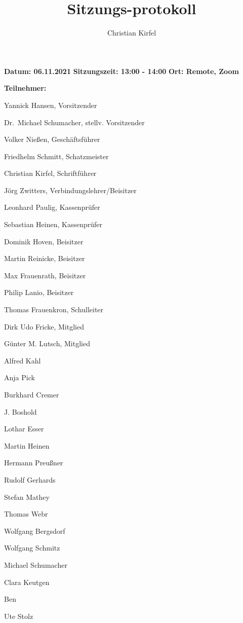 \documentclass[a4paper, 11pt]{article}
\title{Sitzungs-protokoll}
\author{Christian Kirfel}
\begin{document}
\pagestyle{style1}

\textbf{Datum: 06.11.2021} %
\textbf{Sitzungszeit: 13:00 - 14:00}
\textbf{Ort: Remote, Zoom} %

\textbf{Teilnehmer:} %
\begin{description}
\item Yannick Hansen, Vorsitzender
\item Dr.~Michael Schumacher, stellv. Vorsitzender
\item Volker Nießen, Geschäftsführer
\item Friedhelm Schmitt, Schatzmeister
\item Christian Kirfel, Schriftführer
\item Jörg Zwitters, Verbindungslehrer/Beisitzer
\item Leonhard Paulig, Kassenprüfer
\item Sebastian Heinen, Kassenprüfer
\item Dominik Hoven, Beisitzer
\item Martin Reinicke, Beisitzer
\item Max Frauenrath, Beisitzer
\item Philip Lanio, Beisitzer
\item Thomas Frauenkron, Schulleiter
\item Dirk Udo Fricke, Mitglied
\item Günter M. Lutsch, Mitglied
\item Alfred Kahl
\item Anja Pick
\item Burkhard Cremer
\item J. Boshold
\item Lothar Esser
\item Martin Heinen
\item Hermann Preußner
\item Rudolf Gerhards
\item Stefan Mathey
\item Thomas Webr
\item Wolfgang Bergsdorf
\item Wolfgang Schmitz
\item Michael Schumacher
\item Clara Keutgen
\item Ben
\item Ute Stolz
\end{description}
\end{document}
